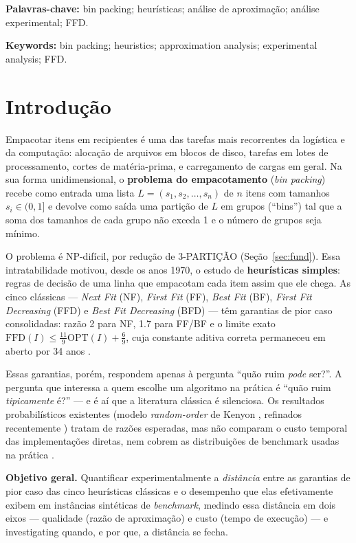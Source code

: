 \documentclass[12pt]{article}
\begin{document}
\noindent\textbf{Palavras-chave:} bin packing; heurísticas; análise de aproximação; análise experimental; FFD.

\vspace{-0.5em}
\noindent\textbf{Keywords:} bin packing; heuristics; approximation analysis; experimental analysis; FFD.

\section{Introdução} \label{sec:intro}

Empacotar itens em recipientes é uma das tarefas mais recorrentes da logística e da computação: alocação de arquivos em blocos de disco, tarefas em lotes de processamento, cortes de matéria-prima, e carregamento de cargas em geral. Na sua forma unidimensional, o \textbf{problema do empacotamento} (\textit{bin packing}) recebe como entrada uma lista $L = (s_1, s_2, \ldots, s_n)$ de $n$ itens com tamanhos $s_i \in (0, 1]$ e devolve como saída uma partição de $L$ em grupos (``bins'') tal que a soma dos tamanhos de cada grupo não exceda 1 e o número de grupos seja mínimo.

O problema é NP-difícil, por redução de 3-PARTIÇÃO (Seção~\ref{sec:fund}). Essa intratabilidade motivou, desde os anos 1970, o estudo de \textbf{heurísticas simples}: regras de decisão de uma linha que empacotam cada item assim que ele chega. As cinco clássicas --- \textit{Next Fit} (NF), \textit{First Fit} (FF), \textit{Best Fit} (BF), \textit{First Fit Decreasing} (FFD) e \textit{Best Fit Decreasing} (BFD) --- têm garantias de pior caso consolidadas: razão 2 para NF, 1.7 para FF/BF e o limite exato $\mathrm{FFD}(I) \leq \frac{11}{9}\mathrm{OPT}(I) + \frac{6}{9}$, cuja constante aditiva correta permaneceu em aberto por 34 anos \cite{dosa2007,dosa2013}.

Essas garantias, porém, respondem apenas à pergunta ``quão ruim \textit{pode} ser?''. A pergunta que interessa a quem escolhe um algoritmo na prática é ``quão ruim \textit{tipicamente} é?'' --- e é aí que a literatura clássica é silenciosa. Os resultados probabilísticos existentes (modelo \textit{random-order} de Kenyon \cite{kenyon1996}, refinados recentemente \cite{albers2021,hebbar2024,ayyadevara2025}) tratam de razões esperadas, mas não comparam o custo temporal das implementações diretas, nem cobrem as distribuições de benchmark usadas na prática \cite{falkenauer1996}.

\textbf{Objetivo geral.} Quantificar experimentalmente a \emph{distância} entre as garantias de pior caso das cinco heurísticas clássicas e o desempenho que elas efetivamente exibem em instâncias sintéticas de \textit{benchmark}, medindo essa distância em dois eixos --- qualidade (razão de aproximação) e custo (tempo de execução) --- e investigating quando, e por que, a distância se fecha.
\end{document}
